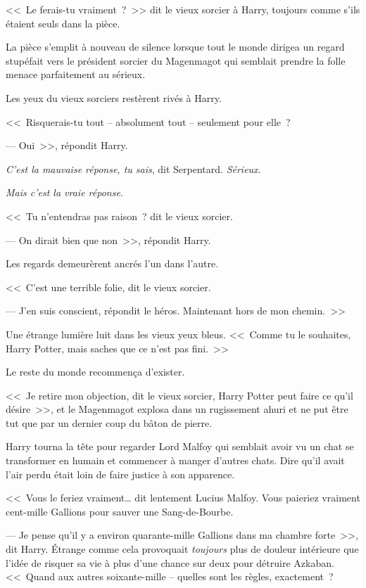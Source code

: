 <<~Le ferais-tu vraiment~?~>> dit le vieux sorcier à Harry, toujours comme s'ils étaient seuls dans la pièce.

La pièce s'emplit à nouveau de silence lorsque tout le monde dirigea un regard stupéfait vers le président sorcier du Magenmagot qui semblait prendre la folle menace parfaitement au sérieux.

Les yeux du vieux sorciers restèrent rivés à Harry.

<<~Risquerais-tu tout -- absolument tout -- seulement pour elle~?

--- Oui~>>, répondit Harry.

\emph{C'est la mauvaise réponse, tu sais}, dit Serpentard. \emph{Sérieux.}

\emph{Mais c'est la vraie réponse.}

<<~Tu n'entendras pas raison~? dit le vieux sorcier.

--- On dirait bien que non~>>, répondit Harry.

Les regards demeurèrent ancrés l'un dans l'autre.

<<~C'est une terrible folie, dit le vieux sorcier.

--- J'en suis conscient, répondit le héros. Maintenant hors de mon chemin.~>>

Une étrange lumière luit dans les vieux yeux bleus. <<~Comme tu le souhaites, Harry Potter, mais saches que ce n'est pas fini.~>>

Le reste du monde recommença d'exister.

<<~Je retire mon objection, dit le vieux sorcier, Harry Potter peut faire ce qu'il désire~>>, et le Magenmagot explosa dans un rugissement ahuri et ne put être tut que par un dernier coup du bâton de pierre.

Harry tourna la tête pour regarder Lord Malfoy qui semblait avoir vu un chat se transformer en humain et commencer à manger d'autres chats. Dire qu'il avait l'air perdu était loin de faire justice à son apparence.

<<~Vous le feriez vraiment… dit lentement Lucius Malfoy. Vous paieriez vraiment cent-mille Gallions pour sauver une Sang-de-Bourbe.

--- Je pense qu'il y a environ quarante-mille Gallions dans ma chambre forte~>>, dit Harry. Étrange comme cela provoquait \emph{toujours} plus de douleur intérieure que l'idée de risquer sa vie à plus d'une chance sur deux pour détruire Azkaban. <<~Quand aux autres soixante-mille -- quelles sont les règles, exactement~?

